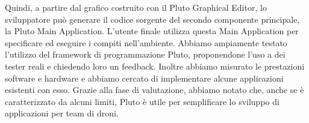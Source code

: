 Quindi, a partire dal grafico costruito con il Pluto Graphical Editor, lo sviluppatore può generare il codice sorgente del secondo componente principale, la Pluto Main Application.
L'utente finale utilizza questa Main Application per specificare ed eseguire i compiti nell'ambiente.
Abbiamo ampiamente testato l'utilizzo del framework di programmazione Pluto, proponendone l'uso a dei tester reali e chiedendo loro un feedback.
Inoltre abbiamo misurato le prestazioni software e hardware e abbiamo cercato di implementare alcune applicazioni esistenti con esso.
Grazie alla fase di valutazione, abbiamo notato che, anche se è caratterizzato da alcuni limiti, Pluto è utile per semplificare lo sviluppo di applicazioni per team di droni.